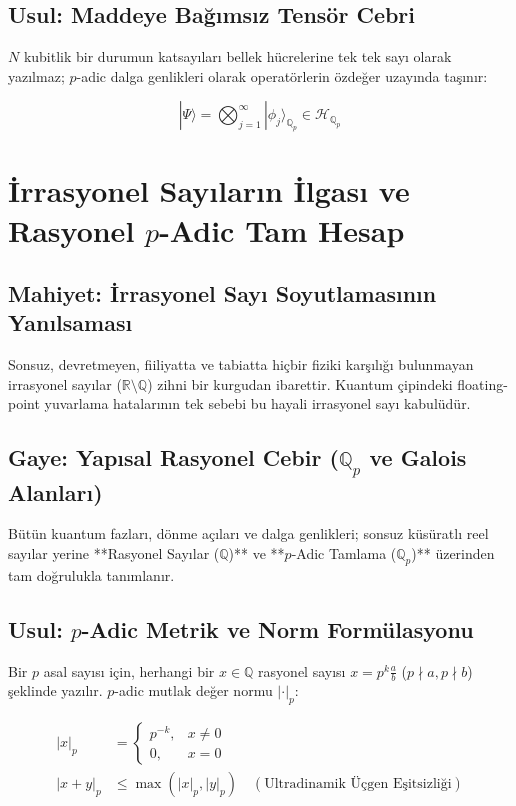 \documentclass[11pt, a4paper]{article}
\begin{document}
\subsection{Usul: Maddeye Bağımsız Tensör Cebri}
$N$ kubitlik bir durumun katsayıları bellek hücrelerine tek tek sayı olarak yazılmaz; $p$-adic dalga genlikleri olarak operatörlerin özdeğer uzayında taşınır:

\begin{equation}
|\Psi\rangle = \bigotimes_{j=1}^{\infty} |\phi_j\rangle_{\mathbb{Q}_p} \in \mathcal{H}_{\mathbb{Q}_p}
\end{equation}

\section{İrrasyonel Sayıların İlgası ve Rasyonel $p$-Adic Tam Hesap}

\subsection{Mahiyet: İrrasyonel Sayı Soyutlamasının Yanılsaması}
Sonsuz, devretmeyen, fiiliyatta ve tabiatta hiçbir fiziki karşılığı bulunmayan irrasyonel sayılar ($\mathbb{R} \setminus \mathbb{Q}$) zihni bir kurgudan ibarettir. Kuantum çipindeki floating-point yuvarlama hatalarının tek sebebi bu hayali irrasyonel sayı kabulüdür.

\subsection{Gaye: Yapısal Rasyonel Cebir ($\mathbb{Q}_p$ ve Galois Alanları)}
Bütün kuantum fazları, dönme açıları ve dalga genlikleri; sonsuz küsüratlı reel sayılar yerine **Rasyonel Sayılar ($\mathbb{Q}$)** ve **$p$-Adic Tamlama ($\mathbb{Q}_p$)** üzerinden tam doğrulukla tanımlanır.

\subsection{Usul: $p$-Adic Metrik ve Norm Formülasyonu}
Bir $p$ asal sayısı için, herhangi bir $x \in \mathbb{Q}$ rasyonel sayısı $x = p^k \frac{a}{b}$ ($p \nmid a, p \nmid b$) şeklinde yazılır. $p$-adic mutlak değer normu $|\cdot|_p$:

\begin{align}
|x|_p &= \begin{cases} p^{-k}, & x \neq 0 \\ 0, & x = 0 \end{cases} \\
|x + y|_p &\le \max(|x|_p, |y|_p) \quad (\text{Ultradinamik Üçgen Eşitsizliği})
\end{align}
\end{document}
